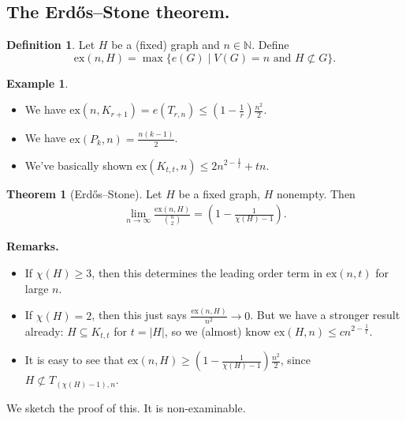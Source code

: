 \documentclass{article}
\theoremstyle{definition}
\newtheorem{theorem}{Theorem}[section]
\newtheorem{example}{Example}[section]
\newtheorem{defn}{Definition}[section]
\begin{document}
\subsection*{The Erdős--Stone theorem.}
\begin{defn}
    Let $H$ be a (fixed) graph and $n \in \mathbb{N}$. Define \[
    \text{ex}(n,H) = \max \{e(G) \mid V(G)=n \text{ and } H \not\subset G\}.
    \]
\end{defn}
\begin{example}
    \begin{itemize}
        \item We have $\text{ex}(n,K_{r+1}) = e(T_{r,n}) \le \left(1-\frac{1}{r}\right)\frac{n^2}{2}$.
        \item We have $\text{ex}(P_k,n)=\frac{n(k-1)}{2}$.
        \item We've basically shown $\text{ex}(K_{t,t},n)\le 2n^{2-\frac{1}{t}}+tn$.
    \end{itemize}
\end{example}
\begin{theorem}[Erdős--Stone]
    Let $H$ be a fixed graph, $H$ nonempty. Then
    \begin{align*}
        \lim_{n \to \infty}\frac{\text{ex}(n,H)}{{{n}\choose{2}}} = \left(1-\frac{1}{\chi(H)-1}\right).
    \end{align*}
\end{theorem}
\textbf{Remarks.}
\begin{itemize}
    \item If $\chi(H)\ge 3$, then this determines the leading order term in $\text{ex}(n,t)$ for large $n$.
    \item If $\chi(H)=2$, then this just says $\frac{\text{ex}(n,H)}{n^2}\to 0$. But we have a stronger result already: $H \subseteq K_{t,t}$ for $t=|H|$, so we (almost) know $\text{ex}(H,n)\le c n^{2-\frac{1}{t}}$.
    \item It is easy to see that $\text{ex}(n,H)\ge (1-\frac{1}{\chi(H)-1})\frac{n^2}{2}$, since $H \not\subset T_{(\chi(H)-1),n}$.
\end{itemize} 
We sketch the proof of this. It is non-examinable.
\end{document}
